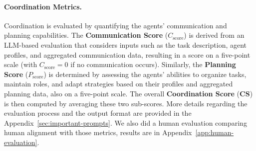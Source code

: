 \paragraph{Coordination Metrics.}  
Coordination is evaluated by quantifying the agents’ communication and planning capabilities. The \textbf{Communication Score} (\(C_{\text{score}}\)) is derived from an LLM-based evaluation that considers inputs such as the task description, agent profiles, and aggregated communication data, resulting in a score on a five-point scale (with \(C_{\text{score}} = 0\) if no communication occurs). Similarly, the \textbf{Planning Score} (\(P_{\text{score}}\)) is determined by assessing the agents’ abilities to organize tasks, maintain roles, and adapt strategies based on their profiles and aggregated planning data, also on a five-point scale. The overall \textbf{Coordination Score} (\textbf{CS}) is then computed by averaging these two sub-scores. More details regarding the evaluation process and the output format are provided in the Appendix~\ref{sec:important-prompts}. We also did a human evaluation comparing human alignment with those metrics, results are in Appendix~\ref{app:human-evaluation}.





